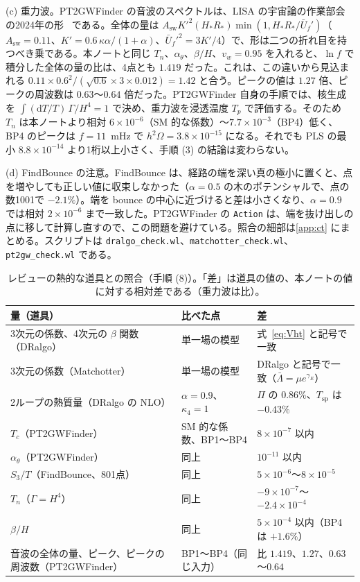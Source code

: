 \documentclass[a4paper,10pt]{ltjsarticle}
\newcommand{\dd}{\mathrm{d}}
\begin{document}
(c) 重力波。PT2GWFinder の音波のスペクトルは、LISA の宇宙論の作業部会の2024年の形~\cite{caprini24} である。全体の量は $A_{\mathrm{sw}}K'^2(H_*R_*)\min(1,H_*R_*/\bar U_f')$（$A_{\mathrm{sw}}=0.11$、$K'=0.6\,\kappa\alpha/(1+\alpha)$、$\bar U_f'^2=3K'/4$）で、形は二つの折れ目を持つべき乗である。本ノートと同じ $T_n$、$\alpha_\theta$、$\beta/H$、$v_w=0.95$ を入れると、$\ln f$ で積分した全体の量の比は、4点とも $1.419$ だった。これは、この違いから見込まれる $0.11\times0.6^2/(\sqrt{0.6}\times3\times0.012)=1.42$ と合う。ピークの値は $1.27$ 倍、ピークの周波数は $0.63$〜$0.64$ 倍だった。PT2GWFinder 自身の手順では、核生成を $\int(\dd T/T)\,\Gamma/H^4=1$ で決め、重力波を浸透温度 $T_p$ で評価する。そのため $T_n$ は本ノートより相対 $6\times10^{-6}$（SM 的な係数）〜$7.7\times10^{-3}$（BP4）低く、BP4 のピークは $f=11$~mHz で $h^2\Omega=3.8\times10^{-15}$ になる。それでも PLS の最小 $8.8\times10^{-14}$ より1桁以上小さく、手順 (3) の結論は変わらない。

(d) FindBounce の注意。FindBounce は、経路の端を深い真の極小に置くと、点を増やしても正しい値に収束しなかった（$\alpha=0.5$ の木のポテンシャルで、点の数1001で $-2.1\%$）。端を bounce の中心に近づけると差は小さくなり、$\alpha=0.9$ では相対 $2\times10^{-6}$ まで一致した。PT2GWFinder の \texttt{Action} は、端を抜け出しの点に移して計算し直すので、この問題を避けている。照合の細部は\ref{app:ct} にまとめる。スクリプトは \texttt{dralgo\_check.wl}、\texttt{matchotter\_check.wl}、\texttt{pt2gw\_check.wl} である。

\begin{table}[tbp]
\centering\small
\caption{レビューの熱的な道具との照合（手順 (8)）。「差」は道具の値の、本ノートの値に対する相対差である（重力波は比）。}
\label{tab:tools}
\begin{tabularx}{\linewidth}{>{\raggedright\arraybackslash}p{5.0cm}>{\raggedright\arraybackslash}X>{\raggedright\arraybackslash}p{4.4cm}}
\toprule
量（道具） & 比べた点 & 差 \\
\midrule
3次元の係数、4次元の $\beta$ 関数（DRalgo） & 単一場の模型 & 式~\eqref{eq:Vht} と記号で一致 \\
3次元の係数（Matchotter） & 単一場の模型 & DRalgo と記号で一致（$\bar\Lambda=\mu e^{\gamma_E}$） \\
2ループの熱質量（DRalgo の NLO） & $\alpha=0.9$、$\kappa_4=1$ & $\Pi$ の $0.86\%$、$T_{\mathrm{sp}}$ は $-0.43\%$ \\
$T_c$（PT2GWFinder） & SM 的な係数、BP1〜BP4 & $8\times10^{-7}$ 以内 \\
$\alpha_\theta$（PT2GWFinder） & 同上 & $10^{-11}$ 以内 \\
$S_3/T$（FindBounce、801点） & 同上 & $5\times10^{-6}$〜$8\times10^{-5}$ \\
$T_n$（$\Gamma=H^4$） & 同上 & $-9\times10^{-7}$〜$-2.4\times10^{-4}$ \\
$\beta/H$ & 同上 & $5\times10^{-4}$ 以内（BP4 は $+1.6\%$） \\
音波の全体の量、ピーク、ピークの周波数（PT2GWFinder） & BP1〜BP4（同じ入力） & 比 $1.419$、$1.27$、$0.63$〜$0.64$ \\
\bottomrule
\end{tabularx}
\end{table}
\end{document}

